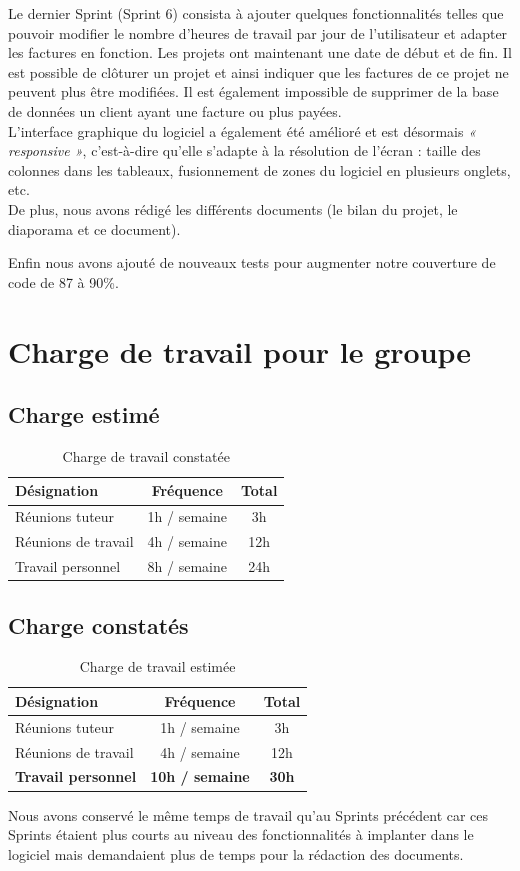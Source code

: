 \documentclass[12pt,a4paper,openany]{article}
\begin{document}
	Le dernier Sprint (Sprint 6) consista à ajouter quelques fonctionnalités telles que pouvoir modifier le nombre d'heures de travail par jour de l'utilisateur et adapter les factures en fonction. Les projets ont maintenant une date de début et de fin. Il est possible de clôturer un projet et ainsi indiquer que les factures de ce projet ne peuvent plus être modifiées. Il est également impossible de supprimer de la base de données un client ayant une facture ou plus payées. \\
	L'interface graphique du logiciel a également été amélioré et est désormais \textit{« responsive »}, c'est-à-dire qu'elle s'adapte à la résolution de l'écran : taille des colonnes dans les tableaux, fusionnement de zones du logiciel en plusieurs onglets, etc. \\
	De plus, nous avons rédigé les différents documents (le bilan du projet, le diaporama et ce document). 
	
	Enfin nous avons ajouté de nouveaux tests pour augmenter notre couverture de code de 87 à 90\%.   
	
	\section{Charge de travail pour le groupe}
	\subsection{Charge estimé}
	\begin{table}[H]
		\centering
		\begin{tabular}{l|c|c}
			\textbf{Désignation} & \textbf{Fréquence} & \textbf{Total}\\
			\hline
			Réunions tuteur & 1h / semaine & 3h\\
			Réunions de travail & 4h / semaine & 12h\\
			Travail personnel & 8h / semaine & 24h
		\end{tabular}
		\caption{Charge de travail constatée}
	\end{table}

	\subsection{Charge constatés}
	\begin{table}[H]
		\centering
		\begin{tabular}{l|c|c}
			\textbf{Désignation} & \textbf{Fréquence} & \textbf{Total}\\
			\hline
			Réunions tuteur & 1h / semaine & 3h\\
			Réunions de travail & 4h / semaine & 12h\\
			\textbf{Travail personnel} & \textbf{10h / semaine} & \textbf{30h}
		\end{tabular}
		\caption{Charge de travail estimée}
	\end{table}
	Nous avons conservé le même temps de travail qu'au Sprints précédent car ces Sprints étaient plus courts au niveau des fonctionnalités à implanter dans le logiciel mais demandaient plus de temps pour la rédaction des documents.  
\end{document}
